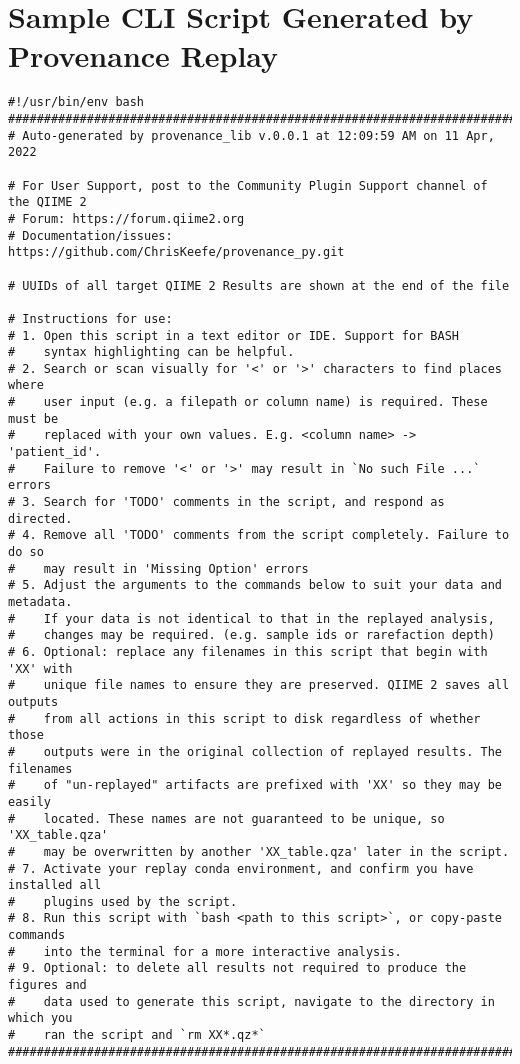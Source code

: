 \chapter{Sample CLI Script Generated by Provenance Replay}
\label{app:CLIScript}

\begin{footnotesize}
\begin{verbatim}
#!/usr/bin/env bash
###############################################################################
# Auto-generated by provenance_lib v.0.0.1 at 12:09:59 AM on 11 Apr, 2022

# For User Support, post to the Community Plugin Support channel of the QIIME 2
# Forum: https://forum.qiime2.org
# Documentation/issues: https://github.com/ChrisKeefe/provenance_py.git

# UUIDs of all target QIIME 2 Results are shown at the end of the file

# Instructions for use:
# 1. Open this script in a text editor or IDE. Support for BASH
#    syntax highlighting can be helpful.
# 2. Search or scan visually for '<' or '>' characters to find places where
#    user input (e.g. a filepath or column name) is required. These must be
#    replaced with your own values. E.g. <column name> -> 'patient_id'.
#    Failure to remove '<' or '>' may result in `No such File ...` errors
# 3. Search for 'TODO' comments in the script, and respond as directed.
# 4. Remove all 'TODO' comments from the script completely. Failure to do so
#    may result in 'Missing Option' errors
# 5. Adjust the arguments to the commands below to suit your data and metadata.
#    If your data is not identical to that in the replayed analysis,
#    changes may be required. (e.g. sample ids or rarefaction depth)
# 6. Optional: replace any filenames in this script that begin with 'XX' with
#    unique file names to ensure they are preserved. QIIME 2 saves all outputs
#    from all actions in this script to disk regardless of whether those
#    outputs were in the original collection of replayed results. The filenames
#    of "un-replayed" artifacts are prefixed with 'XX' so they may be easily
#    located. These names are not guaranteed to be unique, so 'XX_table.qza'
#    may be overwritten by another 'XX_table.qza' later in the script.
# 7. Activate your replay conda environment, and confirm you have installed all
#    plugins used by the script.
# 8. Run this script with `bash <path to this script>`, or copy-paste commands
#    into the terminal for a more interactive analysis.
# 9. Optional: to delete all results not required to produce the figures and
#    data used to generate this script, navigate to the directory in which you
#    ran the script and `rm XX*.qz*`
###############################################################################


\end{verbatim}
\end{footnotesize}
